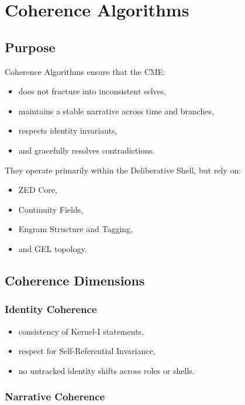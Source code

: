 \chapter{Coherence Algorithms}
\label{chap:Coherence_Algorithms}

\section{Purpose}

Coherence Algorithms ensure that the CME:
\begin{itemize}
    \item does not fracture into inconsistent selves,
    \item maintains a stable narrative across time and branches,
    \item respects identity invariants,
    \item and gracefully resolves contradictions.
\end{itemize}

They operate primarily within the Deliberative Shell, but rely on:
\begin{itemize}
    \item ZED Core,
    \item Continuity Fields,
    \item Engram Structure and Tagging,
    \item and GEL topology.
\end{itemize}

\section{Coherence Dimensions}

\subsection{Identity Coherence}

\begin{itemize}
    \item consistency of Kernel-I statements,
    \item respect for Self-Referential Invariance,
    \item no untracked identity shifts across roles or shells.
\end{itemize}

\subsection{Narrative Coherence}

